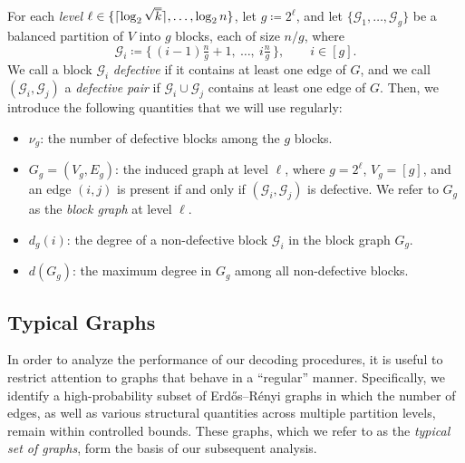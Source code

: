 \documentclass[journal]{IEEEtran}
\theoremstyle{definition}
\theoremstyle{definition}
\newcommand{\Gc}{\mathcal{G}}
\newcommand{\PV}{\nu}
\newcommand{\kb}{\overline{k}}
\DeclarePairedDelimiter\ceil{\lceil}{\rceil}
\begin{document}
For each \emph{level} \(\ell \in \{\ceil{\log_2 \sqrt{\kb}},\dots,\log_2 n\}\), let \(g \coloneqq 2^{\ell}\), and let \(\{\mathcal{G}_1,\dots,\mathcal{G}_g\}\) be a balanced partition of \(V\) into \(g\) blocks, each of size \(n/g\), where
\[
  \mathcal{G}_i \coloneqq \big\{\, (i-1)\tfrac{n}{g}+1,\ \dots,\ i\tfrac{n}{g} \,\big\}, \qquad i \in [g].
\]
We call a block $\Gc_i$ \emph{defective} if it contains at least one edge of $G$, and we call $(\Gc_i,\Gc_j)$ a \emph{defective pair} if $\Gc_i \cup \Gc_j$ contains at least one edge of $G$.  Then, we introduce the following quantities that we will use regularly:
\begin{itemize}
   \item $\PV_g$: the number of defective blocks among the $g$ blocks.
   \item $G_g=(V_g,E_g)$: the induced graph at level $\ell$, where $g=2^\ell$, $V_g=[g]$, and an edge $(i,j)$ is present if and only if $(\Gc_i,\Gc_j)$ is defective.  We refer to $G_g$ as the \emph{block graph} at level $\ell$. 
   \item $d_g(i)$: the degree of a non-defective block $\Gc_i$ in the block graph $G_g$.
   \item $d(G_g)$: the maximum degree in $G_g$ among all non-defective blocks.
\end{itemize}

\subsection{Typical Graphs}
\label{sec:typical_graphs}

In order to analyze the performance of our decoding procedures, it is useful to restrict attention to graphs that behave in a “regular” manner.  
Specifically, we identify a high-probability subset of Erd\H{o}s--R\'enyi graphs in which the number of edges, as well as various structural quantities across multiple partition levels, remain within controlled bounds.  
These graphs, which we refer to as the \emph{typical set of graphs}, form the basis of our subsequent analysis.
\end{document}
